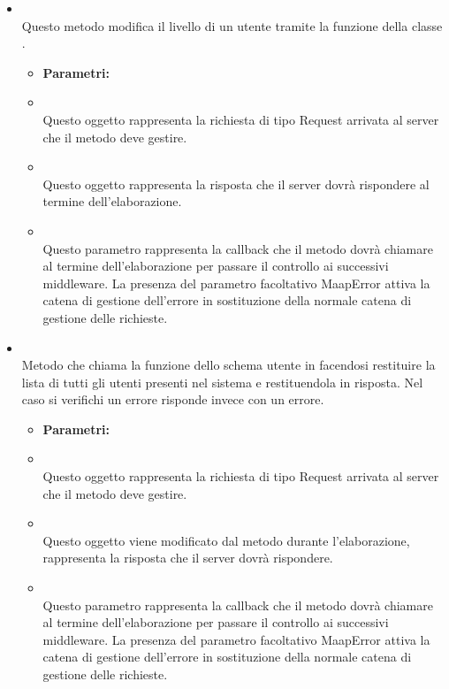 \begin{itemize}
\begin{itemize}
\end{itemize}
\item[] \textbf{} \\ Questo metodo modifica il livello di un utente tramite la funzione  della classe .
\begin{itemize}\addtolength{\itemsep}{-0.5\baselineskip}
\item[] \textbf{Parametri:}
\item[]  \\ Questo oggetto rappresenta la richiesta di tipo Request arrivata al server che il metodo deve gestire.
\item[]  \\ Questo oggetto rappresenta la risposta che il server dovrà rispondere al termine dell'elaborazione.
\item[]  \\ Questo parametro rappresenta la callback che il metodo dovrà chiamare al termine dell'elaborazione per passare il controllo ai successivi middleware. La presenza del parametro facoltativo MaapError attiva la catena di gestione dell'errore in sostituzione della normale catena di gestione delle richieste.
\end{itemize}
\item[] \textbf{} \\ Metodo che chiama la funzione  dello schema utente in  facendosi restituire la lista di tutti gli utenti presenti nel sistema e restituendola in risposta. Nel caso si verifichi un errore risponde invece con un errore.
\begin{itemize}\addtolength{\itemsep}{-0.5\baselineskip}
\item[] \textbf{Parametri:}
\item[]  \\ Questo oggetto rappresenta la richiesta di tipo Request arrivata al server che il metodo deve gestire.
\item[]  \\ Questo oggetto viene modificato dal metodo durante l'elaborazione, rappresenta la risposta che il server dovrà rispondere.
\item[]  \\ Questo parametro rappresenta la callback che il metodo dovrà chiamare al termine dell'elaborazione per passare il controllo ai successivi middleware. La presenza del parametro facoltativo MaapError attiva la catena di gestione dell'errore in sostituzione della normale catena di gestione delle richieste.
\end{itemize}
\end{itemize}

